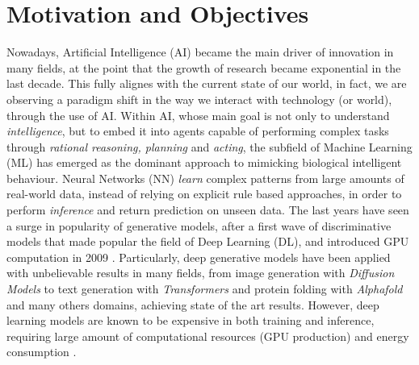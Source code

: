 \section{Motivation and Objectives}
Nowadays, Artificial Intelligence (AI) became the main driver of innovation in many fields, at the point that the growth of research
became exponential in the last decade. This fully alignes with the current state of our world, in fact,
we are observing a paradigm shift in the way we interact with technology (or world), through the use of AI.\newline
Within AI, whose main goal is not only to understand \textit{intelligence}, but to embed it into agents capable of performing complex tasks through
\textit{rational reasoning, planning} and \textit{acting}, the subfield of Machine Learning (ML) has emerged as the dominant approach to mimicking biological intelligent behaviour.
Neural Networks (NN) \textit{learn} complex patterns from large amounts of real-world data, instead of relying on explicit rule based approaches,
in order to perform \textit{inference} and return prediction on unseen data. \newline
The last years have seen a surge in popularity of generative models, after a first wave of discriminative models that made popular the field of Deep Learning (DL),
and introduced GPU computation in 2009 \cite{Raina2009LSDL}. 
Particularly, deep generative models have been applied with unbelievable results in many fields,
 from image generation with \textit{Diffusion Models} \cite{ho2020denoisingdiffusionprobabilisticmodels}
 to text generation with \textit{Transformers} \cite{vaswani2023attentionneed} and protein folding with
\textit{Alphafold} \cite{jumper2021highly} and many others domains, achieving state of the art results.
However, deep learning models are known to be expensive in both training and inference, requiring large 
amount of computational resources (GPU production) and energy consumption \cite{article}.


